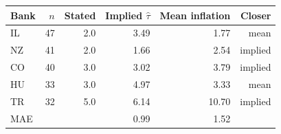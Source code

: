 \begin{tabular}{lrrrrr}\toprule
Bank & $n$ & Stated & Implied $\hat\tau$ & Mean inflation & Closer \\\midrule
IL & 47 & 2.0 & 3.49 & 1.77 & mean\\
NZ & 41 & 2.0 & 1.66 & 2.54 & implied\\
CO & 40 & 3.0 & 3.02 & 3.79 & implied\\
HU & 33 & 3.0 & 4.97 & 3.33 & mean\\
TR & 32 & 5.0 & 6.14 & 10.70 & implied\\
\midrule
MAE & & & 0.99 & 1.52 & \\
\bottomrule\end{tabular}